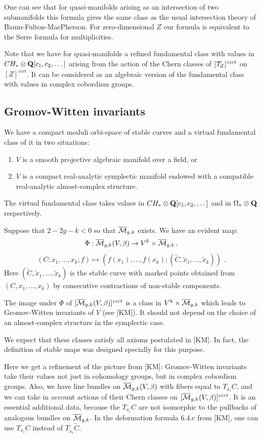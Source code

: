 \documentclass{amsart}
\begin{document}
One can see that for quasi-manifolds arising as an intersection of two
submanifolds this formula gives the same class as the usual intersection theory
of Baum-Fulton-MacPherson. For zero-dimensional $Z$ our formula is equivalent
to the Serre formula for multiplicities.

 Note that we have for quasi-manifolds a refined fundamental class with values
in $CH_*\otimes \mathbf Q[c_1,c_2,\dots]$ arising from the action of
 the Chern classes of $[\mathcal T_Z]^{virt}$ on $[Z]^{virt}$. It can be considered
as an algebraic version of the fundamental class with values in complex
cobordism groups.

\subsection{Gromov-Witten invariants}

We have a compact moduli orbi-space of stable curves and a virtual fundamental
class of it in two situations:
\begin{enumerate}
\item $V$ is a smooth projective algebraic manifold over a field, or
\item $V$ is a compact real-analytic symplectic manifold endowed with a
compatible real-analytic almost-complex structure.
\end{enumerate}

The virtual fundamental class takes values in $CH_*\otimes \mathbf Q[c_1,c_2,\dots]$
and in $\Omega_*\otimes\mathbf Q$ respectively.

Suppose that $2-2g-k<0$ so that $\overline{\mathcal{M}}_{g,k}$ exists.
 We have an evident map:
$$\Phi:\overline{\mathcal{M}}_{g,k}(V,\beta)\to V^k\times\overline{\mathcal{M}}_{g,k}\,,$$
$$(C;x_1,\dots,x_k;f)\mapsto \left(f(x_1),\dots,f(x_k);(\widetilde C,\tilde
x_1,\dots,\tilde x_k)\right)\,\,.$$
Here $(\widetilde C,\tilde x_1,\dots,\tilde x_k)$ is the stable curve with
marked points obtained from $(C,x_1,\dots,x_k)$ by consecutive contractions of
non-stable components.

The image under $\Phi$ of  $[\overline{\mathcal{M}}_{g,k}(V,\beta)]^{virt}$ is a
 class in $V^k\times\overline{\mathcal{M}}_{g,k}$ which leads to Gromov-Witten invariants of $V$
(see [KM]). It should not depend on the choice of  an almost-complex structure
in the symplectic case.

We expect that these classes satisfy all axioms postulated in [KM]. In fact,
the definition of stable maps was designed specially for this purpose.

Here we get a refinement of the  picture from [KM]: Gromov-Witten invariants
take their values not just in cohomology groups, but in complex cobordism
groups. Also, we have line bundles on $\overline{\mathcal{M}}_{g,k}(V,\beta)$ with fibers equal to
$T_{x_i}C$, and we can take in account actions of their Chern classes on
$[\overline{\mathcal{M}}_{g,k}(V,\beta)]^{virt}$. It is an essential additional data,
 because the $T_{x_i}C$ are not isomorphic to the pullbacks of analogous
bundles on $\overline{\mathcal{M}}_{g,k}$. In the deformation formula 6.4.c from [KM],  one can use
$T_{x_i}C$
 instead of $T_{\tilde x_i}\widetilde C$.
\end{document}
